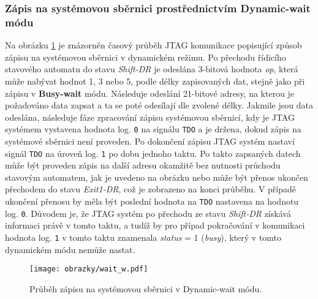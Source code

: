\subsubsection{Zápis na systémovou sběrnici prostřednictvím Dynamic-wait módu} 
Na obrázku \ref{fig:wait_w} je znázorněn časový průběh \acs{JTAG} komunikace popisující způsob zápisu na systémovou sběrnici v dynamickém  režimu. Po přechodu řídicího stavového automatu do stavu \textit{Shift-DR} je odeslána 3-bitová hodnota \textit{op}, která může nabývat hodnot 1, 3 nebo 5, podle délky zapisovaných dat, stejně jako při zápisu v \textbf{Busy-wait} módu. Následuje odeslání 21-bitové adresy, na kterou je požadováno data zapsat a ta se poté odesílají dle zvolené délky. Jakmile jsou data odeslána, následuje fáze zpracování zápisu systémovou sběrnicí, kdy je \acs{JTAG} systémem vystavena hodnota log. \texttt{0} na signálu \texttt{\acs{TDO}} a je držena, dokud zápis na systémové sběrnici není proveden. Po dokončení zápisu \acs{JTAG} systém nastaví signál \texttt{\acs{TDO}} na úroveň log. \texttt{1} po dobu jednoho taktu. Po takto zapsaných datech může být proveden zápis na další adresu okamžitě bez nutnosti průchodu stavovým automatem, jak je uvedeno na obrázku nebo může být přenos ukončen přechodem do stavu \textit{Exit1-DR}, což je zobrazeno na konci průběhu. V případě ukončení přenosu by měla být poslední hodnota na \texttt{\acs{TDO}} nastavena na hodnotu log. \texttt{0}. Důvodem je, že \acs{JTAG} systém po přechodu ze stavu \textit{Shift-DR} získává informaci právě v tomto taktu, a tudíž by pro případ pokračování v komunikaci hodnota log. \texttt{1} v tomto taktu znamenala \textit{status} = 1 (\textit{busy}), který v tomto dynamickém módu nemůže nastat.

\begin{figure}[!h]
  \begin{center}
    \texttt{[image: obrazky/wait\_w.pdf]}
  \end{center}
  \caption{Průběh zápisu na systémovou sběrnici v Dynamic-wait módu.}
	\label{fig:wait_w}
\end{figure}

